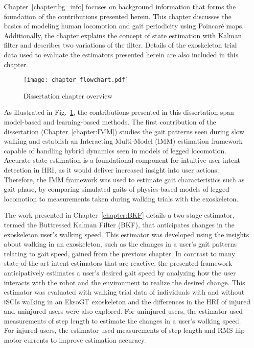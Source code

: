Chapter~\ref{chapter:bg_info} focuses on background information that forms the foundation of the contributions presented herein. This chapter discusses the basics of modeling human locomotion and gait periodicity using Poincar\'e maps. Additionally, the chapter explains the concept of state estimation with Kalman filter and describes two variations of the filter. Details of the exoskeleton trial data used to evaluate the estimators presented herein are also included in this chapter.

\begin{figure}
	\centering
	\texttt{[image: chapter\_flowchart.pdf]}
	\caption{Dissertation chapter overview \label{fig:chapter_flowchart}}
\end{figure}

As illustrated in Fig.~\ref{fig:chapter_flowchart}, the contributions presented in this dissertation span model-based and learning-based methods. The first contribution of the dissertation (Chapter~\ref{chapter:IMM}) studies the gait patterns seen during slow walking and establish an Interacting Multi-Model (IMM) estimation framework capable of handling hybrid dynamics seen in models of legged locomotion. Accurate state estimation is a foundational component for intuitive user intent detection in HRI, as it would deliver increased insight into user actions. Therefore, the IMM framework was used to estimate gait characteristics such as gait phase, by comparing simulated gaits of physics-based models of legged locomotion to measurements taken during walking trials with the exoskeleton. 

The work presented in Chapter~\ref{chapter:BKF} details a two-stage estimator, termed the Buttressed Kalman Filter (BKF), that anticipates changes in the exoskeleton user’s walking speed. This estimator was developed using the insights about walking in an exoskeleton, such as the changes in a user's gait patterns relating to gait speed, gained from the previous chapter. In contrast to many state-of-the-art intent estimators that are reactive, the presented framework anticipatively estimates a user's desired gait speed by analyzing how the user interacts with the robot and the environment to realize the desired change. This estimator was evaluated with walking trial data of individuals with and without iSCIs walking in an EksoGT exoskeleton and the differences in the HRI of injured and uninjured users were also explored. For uninjured users, the estimator used measurements of step length to estimate the changes in a user's walking speed. For injured users, the estimator used measurements of step length and RMS hip motor currents to improve estimation accuracy.

